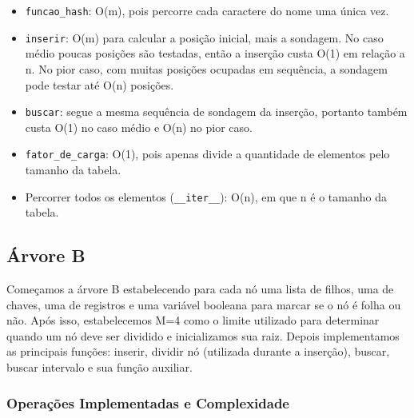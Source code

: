 \documentclass[12pt,a4paper]{article}
\begin{document}
\begin{itemize}
    \item \texttt{funcao\_hash}: O(m), pois percorre cada caractere do nome uma única vez.
    \item \texttt{inserir}: O(m) para calcular a posição inicial, mais a sondagem. No caso médio poucas posições são testadas, então a inserção custa O(1) em relação a n. No pior caso, com muitas posições ocupadas em sequência, a sondagem pode testar até O(n) posições.
    \item \texttt{buscar}: segue a mesma sequência de sondagem da inserção, portanto também custa O(1) no caso médio e O(n) no pior caso.
    \item \texttt{fator\_de\_carga}: O(1), pois apenas divide a quantidade de elementos pelo tamanho da tabela.
    \item Percorrer todos os elementos (\texttt{\_\_iter\_\_}): O(n), em que n é o tamanho da tabela.
\end{itemize}

\subsection{Árvore B}
Começamos a árvore B estabelecendo para cada nó uma lista de filhos, uma de chaves, uma de registros e uma variável booleana para marcar se o nó é folha ou não. Após isso, estabelecemos M=4 como o limite utilizado para determinar quando um nó deve ser dividido e inicializamos sua raiz. Depois implementamos as principais funções: inserir, dividir nó (utilizada durante a inserção), buscar, buscar intervalo e sua função auxiliar.

\subsubsection{Operações Implementadas e Complexidade}
\end{document}
